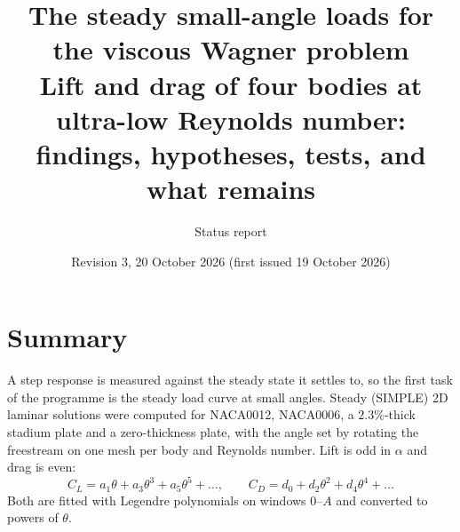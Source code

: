 \documentclass[11pt,a4paper]{article}
\title{The steady small-angle loads for the viscous Wagner problem\\[2pt]
\large Lift and drag of four bodies at ultra-low Reynolds number: findings, hypotheses, tests,
and what remains}
\author{Status report}
\date{Revision 3, 20 October 2026 (first issued 19 October 2026)}
\newcommand{\CL}{C_L}
\newcommand{\CD}{C_D}
\begin{document}
\maketitle

\section*{Summary}

A step response is measured against the steady state it settles to, so the first task of the
programme is the steady load curve at small angles. Steady (SIMPLE) 2D laminar solutions were
computed for NACA0012, NACA0006, a $2.3\%$-thick stadium plate and a zero-thickness plate, with the angle
set by rotating the freestream on one mesh per body and Reynolds number. Lift is odd in $\alpha$ and
drag is even:
\[
\CL = a_1\theta + a_3\theta^3 + a_5\theta^5 + \dots,\qquad
\CD = d_0 + d_2\theta^2 + d_4\theta^4 + \dots
\]
Both are fitted with Legendre polynomials on windows $0$--$A$ and converted to powers of $\theta$.
\end{document}
